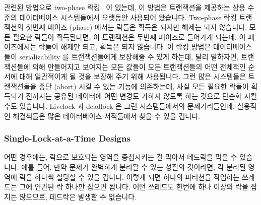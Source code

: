관련된 방법으로 two-phase 락킹~\cite{PhilipABernstein1987} 이 있는데, 이 방법은
트랜잭션을 제공하는 상용 수준의 데이터베이스 시스템들에서 오랫동안 사용되어
왔습니다.
Two-phase 락킹 트랜잭션의 첫번째 페이즈 (phase) 에서는 락들은 획득은 되지만
해제는 되지 않습니다.
모든 필요한 락들이 획득된다면, 이 트랜잭션은 두번째 페이즈로 들어가게 되는데,
이 페이즈에서는 락들이 해제만 되고, 획득은 되지 않습니다.
이 락킹 방법은 데이터베이스들이 serializability 를 트랜잭션들에게 보장해줄 수
있게 하는데, 달리 말하자면, 트랜잭션들에 의해 만들어지고 보여지는 모든 값들이
모든 트랜잭션들의 어떤 전체적인 순서에 대해 일관적이게 될 것을 보장해 주기 위해
사용됩니다.
그런 많은 시스템들은 트랜잭션들을 중단 (abort) 시킬 수 있는 기능에 의존하는데,
사실 모든 필요한 락들이 획득되기 전까지는 공유된 데이터에 어떤 변경도 가하지
않도록 하는 것으로 단순화 시킬 수도 있습니다.
Livelock 과 deadlock 은 그런 시스템들에서의 문제거리들인데, 실용적인 해결책들은
많은 데이터베이스 서적들에서 찾을 수 있을 겁니다.

\subsubsection{Single-Lock-at-a-Time Designs}
\label{sec:locking:Single-Lock-at-a-Time Designs}

어떤 경우에는, 락으로 보호되는 영역을 중첩시키는 걸 막아서 데드락을 막을 수
있습니다.
예를 들어, 만약 문제가 완벽하게 분리될 수 있는 성질의 것이라면, 각 분리된
영역에 락을 하나씩 할당할 수 있을 겁니다.
이렇게 되면 하나의 파티션을 작업하는 쓰레드는 그에 연관된 락 하나만 잡으면
됩니다.
어떤 쓰레드도 한번에 하나 이상의 락을 잡지는 않으므로, 데드락은 발생할 수
없습니다.


